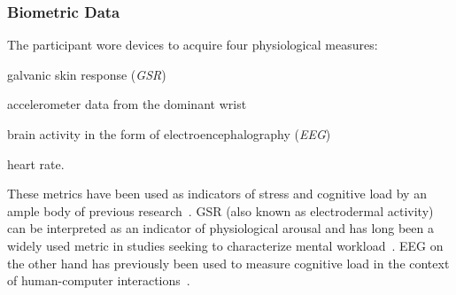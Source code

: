 \documentclass[10pt,letterpaper]{article}
\providecommand{\DIFaddtex}[1]{#1} %
\providecommand{\DIFdeltex}[1]{} %
\providecommand{\DIFaddbegin}{\protect\color{blue}} %
\providecommand{\DIFaddend}{\protect\color{black}} %
\providecommand{\DIFdelbegin}{\protect\color{red}} %
\providecommand{\DIFdelend}{\protect\color{black}} %
\providecommand{\DIFadd}[1]{\texorpdfstring{\DIFaddtex{#1}}{#1}} %
\providecommand{\DIFdel}[1]{\texorpdfstring{\DIFdeltex{#1}}{}} %
\newcommand{\DIFscaledelfig}{0.5}
\newlength{\DIFdelgraphicswidth} %
\newlength{\DIFdelgraphicsheight} %
\newcommand{\DIFaddincludegraphics}[2][]{{\color{blue}\fbox{\DIFOincludegraphics[#1]{#2}}}} %
\newcommand{\DIFdelincludegraphics}[2][]{%
\sbox{\DIFdelgraphicsbox}{\DIFOincludegraphics[#1]{#2}}%
\settoboxwidth{\DIFdelgraphicswidth}{\DIFdelgraphicsbox} %
\settoboxtotalheight{\DIFdelgraphicsheight}{\DIFdelgraphicsbox} %
\scalebox{\DIFscaledelfig}{%
\parbox[b]{\DIFdelgraphicswidth}{\usebox{\DIFdelgraphicsbox}\\[-\baselineskip] \rule{\DIFdelgraphicswidth}{0em}}\llap{\resizebox{\DIFdelgraphicswidth}{\DIFdelgraphicsheight}{%
\setlength{\unitlength}{\DIFdelgraphicswidth}%
\begin{picture}(1,1)%
\thicklines\linethickness{2pt} %
{\color[rgb]{1,0,0}\put(0,0){\framebox(1,1){}}}%
{\color[rgb]{1,0,0}\put(0,0){\line( 1,1){1}}}%
{\color[rgb]{1,0,0}\put(0,1){\line(1,-1){1}}}%
\end{picture}%
}\hspace*{3pt}}} %
} %
\DeclareRobustCommand{\DIFaddbegin}{\DIFOaddbegin \let\includegraphics\DIFaddincludegraphics} %
\DeclareRobustCommand{\DIFaddend}{\DIFOaddend \let\includegraphics\DIFOincludegraphics} %
\DeclareRobustCommand{\DIFdelbegin}{\DIFOdelbegin \let\includegraphics\DIFdelincludegraphics} %
\DeclareRobustCommand{\DIFdelend}{\DIFOaddend \let\includegraphics\DIFOincludegraphics} %
\begin{document}
\subsubsection{Biometric Data}
The participant wore devices to acquire four physiological measures:
\DIFaddbegin \begin{enumerate*}[itemjoin={{, }},
                  itemjoin*={{, and }},
                  label={{(\arabic*)}}]
  \item galvanic skin response (\emph{GSR})
  \item accelerometer data from the dominant wrist
  \item brain activity in the form of electroencephalography (\emph{EEG})
  \item heart rate.
\end{enumerate*}
\DIFaddend 

\DIFdelbegin %

\DIFdelend These metrics have been used as indicators of stress and cognitive load by an ample body of previous research~\autocite{khawadi2015:usinggsrtrust,kuikkaniemi2010:biofeedback,solovey2014:classifyingdriverworkload}.
\DIFdelbegin \DIFdel{More specifically, galvanic skin response (\emph{GSR}, }\DIFdelend \DIFaddbegin \DIFadd{GSR (}\DIFaddend also known as electrodermal activity) \DIFdelbegin \DIFdel{is the measure of the variation of the conductive properties of human skin due to changes in the state of the sweat glands.
It is }\DIFdelend \DIFaddbegin \DIFadd{can be }\DIFaddend interpreted as an indicator of physiological arousal and has long been a widely used metric in studies seeking to characterize mental workload~\autocite{peterson1907psycho,Healey2005,Son2010,khawadi2015:usinggsrtrust,kuikkaniemi2010:biofeedback,solovey2014:classifyingdriverworkload,}.
\DIFdelbegin \DIFdel{Electroencephalography (\emph{EEG}) refers to the monitoring of brain activity through the measurement of the fluctuations of the electric field surrounding the brain.
\emph{EEG} measures the voltage fluctuations due to electrical activity within neurons in the brain, which result in distinct waves of specific frequencies associated with different contexts, emotions and actions.
\emph{EEG} has }\DIFdelend \DIFaddbegin \DIFadd{EEG on the other hand has previously }\DIFaddend been used to measure cognitive load in the context of human-computer interactions~\autocite{Antonenko2010,Grimes2008,kumar2016measurement}.
\end{document}
